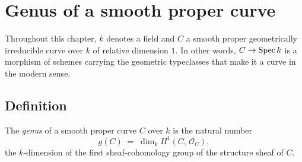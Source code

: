 \chapter{Genus of a smooth proper curve}
\label{chap:Genus}

Throughout this chapter, \(k\) denotes a field and \(C\) a smooth proper geometrically irreducible curve over \(k\) of relative dimension \(1\). In other words, \(C \to \operatorname{Spec} k\) is a morphism of schemes carrying the geometric typeclasses that make it a curve in the modern sense.

\section{Definition}

\begin{definition}\leanok
  \label{def:genus}
  
  The \emph{genus} of a smooth proper curve \(C\) over \(k\) is the natural number
  \[
    g(C) \;=\; \dim_k H^1(C,\, \mathcal O_C),
  \]
  the \(k\)-dimension of the first sheaf-cohomology group of the structure sheaf of \(C\).
\end{definition}

